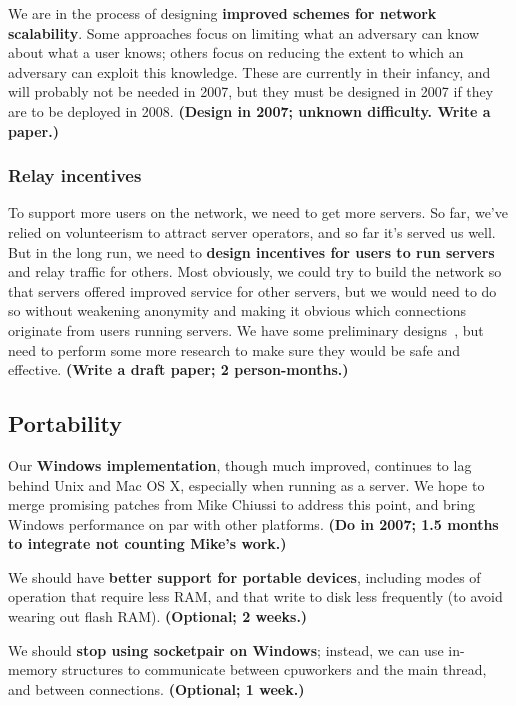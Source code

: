 \documentclass{article}
\newcommand{\plan}[1]{ {\bf (#1)}}
\begin{document}
We are in the process of designing {\bf improved schemes for network
  scalability}.  Some approaches focus on limiting what an adversary can know
about what a user knows; others focus on reducing the extent to which an
adversary can exploit this knowledge.  These are currently in their infancy,
and will probably not be needed in 2007, but they must be designed in 2007 if
they are to be deployed in 2008.\plan{Design in 2007; unknown difficulty.
  Write a paper.}

\subsubsection{Relay incentives}
To support more users on the network, we need to get more servers.  So far,
we've relied on volunteerism to attract server operators, and so far it's
served us well.  But in the long run, we need to {\bf design incentives for
  users to run servers} and relay traffic for others.  Most obviously, we
could try to build the network so that servers offered improved service for
other servers, but we would need to do so without weakening anonymity and
making it obvious which connections originate from users running servers.  We
have some preliminary designs~\cite{incentives-txt,tor-challenges},
but need to perform
some more research to make sure they would be safe and effective.\plan{Write
  a draft paper; 2 person-months.}

\subsection{Portability}
Our {\bf Windows implementation}, though much improved, continues to lag
behind Unix and Mac OS X, especially when running as a server.  We hope to
merge promising patches from Mike Chiussi to address this point, and bring
Windows performance on par with other platforms.\plan{Do in 2007; 1.5 months
  to integrate not counting Mike's work.}

We should have {\bf better support for portable devices}, including modes of
operation that require less RAM, and that write to disk less frequently (to
avoid wearing out flash RAM).\plan{Optional; 2 weeks.}

We should {\bf stop using socketpair on Windows}; instead, we can use
in-memory structures to communicate between cpuworkers and the main thread,
and between connections.\plan{Optional; 1 week.}
\end{document}
